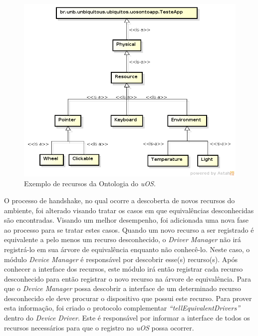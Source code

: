 \begin{figure}[ht]
	\center
	\includegraphics[scale=0.7]{imagens/ontologia}
	\caption{Exemplo de recursos da Ontologia do \emph{uOS}.}
	\label{fig:ontologiaUOS}
\end{figure}

O processo de handshake, no qual ocorre a descoberta de novos recursos do ambiente, foi alterado visando tratar os casos em que equivalências desconhecidas são encontradas. Visando um melhor desempenho, foi adicionada uma nova fase ao processo para se tratar estes casos. Quando um novo recurso a ser registrado é equivalente a pelo menos um recurso desconhecido, o \emph{Driver Manager} não irá registrá-lo em sua árvore de equivalência enquanto não conhecê-lo. Neste caso, o módulo \emph{Device Manager} é responsável por descobrir esse(s) recurso(s). Após conhecer a interface dos recursos, este módulo irá então registrar cada recurso desconhecido para então registrar o novo recurso na árvore de equivalência. Para que o \emph{Device Manager} possa descobrir a interface de um determinado recurso desconhecido ele deve procurar o dispositivo que possui este recurso. Para prover esta informação, foi criado o protocolo complementar \emph{``tellEquivalentDrivers''} dentro do \emph{Device Driver}. Este é responsável por informar a interface de todos os recursos necessários para que o registro no \emph{uOS} possa ocorrer.